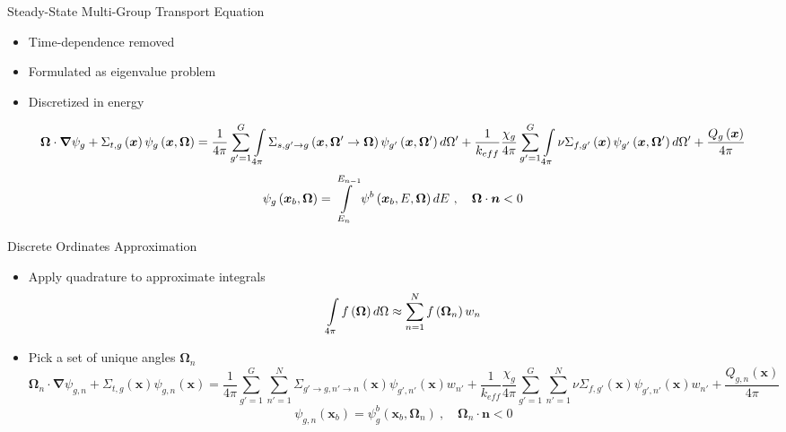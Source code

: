 \begin{frame}[t]{Steady-State Multi-Group Transport Equation}    

\begin{itemize}
    \item Time-dependence removed
    \item Formulated as eigenvalue problem
    \item Discretized in energy
\end{itemize}    
        \begin{dmath*}
            {\bm \Omega \cdot \bm \nabla \psi_g} + {\Sigma_{t,g}\left(\bm 
            x\right)\psi_g\left(\bm x,\bm \Omega\right)} = 
            {\frac{1}{4\pi}\sum_{g'=1}^G \intop_{4\pi} \Sigma_{s,g'\rightarrow 
            g}\left(\bm x,\bm \Omega' \rightarrow \bm \Omega\right) 
            \psi_{g'}\left(\bm x,\bm \Omega'\right) d\Omega'} + 
            {\frac{1}{k_{eff}}\frac{\chi_g}{4\pi} \sum_{g'=1}^{G} \intop_{4\pi} 
            \nu \Sigma_{f,g'}\left(\bm x\right) \psi_{g'}\left(\bm x,\bm 
            \Omega'\right)d\Omega' + \frac{Q_g\left(\bm x\right)}{4\pi}}
        \end{dmath*}
        \begin{equation*}\label{e:multigroupboltzmannBC}
        \psi_g\left(\bm x_b, \bm{\Omega}\right) = \intop_{E_n}^{E_{n-1}} \psi^b\left(\bm x_b, E, \bm{\Omega}\right)dE\ ,\quad \bm{\Omega}\cdot \bm n < 0
        \end{equation*}

\end{frame}


\begin{frame}[t]{Discrete Ordinates Approximation}
  
  \begin{itemize}
    \item Apply quadrature to approximate integrals
    \begin{equation*}
    \intop_{4\pi} f\left(\bm \Omega\right)d\Omega \approx \sum_{n=1}^N 
    f\left(\bm \Omega_n\right) w_n
    \end{equation*}
    \item Pick a set of unique angles $\bm \Omega_n$
    \begin{dmath*}
      \bm\Omega_n\cdot\bm\nabla\psi_{g,n} + \Sigma_{t,g}\left(\bm 
      x\right)\psi_{g,n}\left(\bm x\right) = {\frac{1}{4\pi}\sum_{g'=1}^G 
      \sum_{n'=1}^N \Sigma_{g'\rightarrow g,n'\rightarrow n}\left(\bm 
      x\right)\psi_{g',n'}\left(\bm x\right) w_{n'}} + 
      {\frac{1}{k_{eff}}\frac{\chi_g}{4\pi} \sum_{g'=1}^G \sum_{n'=1}^N 
      \nu\Sigma_{f,g'}\left(\bm x\right)\psi_{g',n'}\left(\bm x\right) w_{n'}} 
      + \frac{Q_{g,n}\left(\bm x\right)}{4\pi}
    \end{dmath*}
    \begin{equation*}
      \psi_{g,n}\left(\bm x_b\right) = \psi_{g}^b\left(\bm 
      x_b,\bm{\Omega}_n\right)\ ,\quad \bm{\Omega}_n\cdot \bm n < 0
    \end{equation*}
  \end{itemize}
  
\end{frame}

